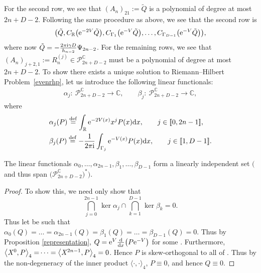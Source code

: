 For the second row, we see that $(A_{n})_{21} := \tilde{Q}$ is a polynomial of degree at most $2n+D-2$. Following the same procedure as above, we see that the second row is
\begin{equation*}
\big( \tilde{Q} , C_{\mathbb{R}}\big({\rm e}^{-2V} \tilde{Q}\big) , C_{\Gamma_1}\big({\rm e}^{-V} \tilde{Q}\big) , \dots , C_{\Gamma_{D-1}}\big({\rm e}^{-V} \tilde{Q}\big)
\big),
\end{equation*}
where now $\tilde{Q} = - \frac{2\pi {\rm i} \gamma D}{h_{n-2}} \Psi_{2n-2}$. For the remaining rows, we see that $(A_n)_{j+2,1} := R^{(j)}_n \in \mathscr{P}^{\mathbb{C}}_{2n+D-2}$ must be a polynomial of degree at most $2n+D-2$. To show there exists a unique solution to Riemann--Hilbert Problem~\ref{evenrhp}, let us introduce the following linear functionals:
\begin{align*}
\alpha_j \colon\ \mathscr{P}^{\mathbb{C}}_{2n+D-2} \longrightarrow \mathbb{C},\qquad
\beta_j \colon\ \mathscr{P}^{\mathbb{C}}_{2n+D-2} \longrightarrow \mathbb{C},
\end{align*}
where
\begin{align}
&\alpha_j(P) \overset{\mathrm{def}}{=} \int_\mathbb{R} {\rm e}^{-2V(x)} x^j P(x) {\rm d}x,\qquad j \in [\![ 0, 2n-1 ]\!],\label{alpha} \\
&\beta_j(P) \overset{\mathrm{def}}{=} -\frac{1}{2\pi {\rm i}} \int_{\Gamma_j} {\rm e}^{-V(x)} P(x) {\rm d}x,\qquad j \in [\![ 1, D-1]\!]. \label{beta}
\end{align}
\begin{Lemma}\label{linindep}The linear functionals $\alpha_0, \dots, \alpha_{2n-1}, \beta_1, \dots, \beta_{D-1}$ form a linearly independent set $\big($and thus span $\big(\mathscr{P}_{2n+D-2}^{\mathbb{C}}\big)^\ast\big)$.
\end{Lemma}

\begin{proof}
To show this, we need only show that
\begin{equation*}
\bigcap_{j=0}^{2n-1} \ker \alpha_j \cap \bigcap_{k=1}^{D-1} \ker \beta_k = 0.
\end{equation*}
Thus let  be such that $\alpha_0(Q) = \dots = \alpha_{2n-1}(Q)= \beta_1(Q) = \dots = \beta_{D-1}(Q)=0$. Thus by Proposition \ref{representation}, $Q = {\rm e}^V \frac{\rm d}{{\rm d}x}\big( P {\rm e}^{-V}\big)$ for some . Furthermore, $\smash{\big\langle \mathit{X}^0, P \big\rangle_4 =} \dots = \big\langle \mathit{X}^{2n-1}, P \big\rangle_4 = 0$. Hence $P$ is skew-orthogonal to all of . Thus by the non-degeneracy of the inner product $\langle \cdot,\cdot \rangle_4$, $P \equiv 0$, and hence $Q \equiv 0$.
\end{proof}

